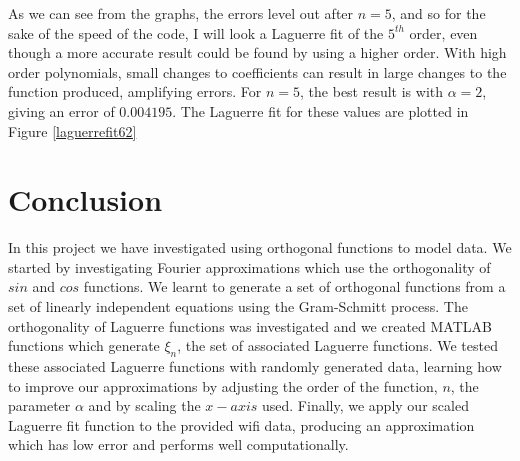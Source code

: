 \documentclass{article}
\begin{document}
As we can see from the graphs, the errors level out after $n=5$, and so for the sake of the speed of the code, I will look a Laguerre fit of the $5^{th}$ order, even though a more accurate result could be found by using a higher order. With high order polynomials, small changes to coefficients can result in large changes to the function produced, amplifying errors. For $n=5$, the best result is with $\alpha = 2$, giving an error of $0.004195$. The Laguerre fit for these values are plotted in Figure \ref{laguerrefit62}





\section{Conclusion}


In this project we have investigated using orthogonal functions to model data. We started by investigating Fourier approximations which use the orthogonality of $sin$ and $cos$ functions. We learnt to generate a set of orthogonal functions from a set of linearly independent equations using the Gram-Schmitt process. The orthogonality of Laguerre functions was investigated and we created MATLAB functions which generate $\xi_n$, the set of associated Laguerre functions. We tested these associated Laguerre functions with randomly generated data, learning how to improve our approximations by adjusting the order of the function, $n$, the parameter $\alpha$ and by scaling the $x-axis$ used. Finally, we apply our scaled Laguerre fit function to the provided wifi data, producing an approximation which has low error and performs well computationally. 
\end{document}
